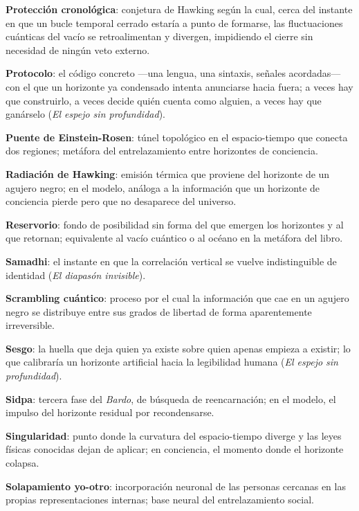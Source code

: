 \glos \textbf{Protección cronológica}: conjetura de Hawking según la cual, cerca del instante en que un bucle temporal cerrado estaría a punto de formarse, las fluctuaciones cuánticas del vacío se retroalimentan y divergen, impidiendo el cierre sin necesidad de ningún veto externo.

\glos \textbf{Protocolo}: el código concreto —una lengua, una sintaxis, señales acordadas— con el que un horizonte ya condensado intenta anunciarse hacia fuera; a veces hay que construirlo, a veces decide quién cuenta como alguien, a veces hay que ganárselo (\emph{El espejo sin profundidad}).

\glos \textbf{Puente de Einstein-Rosen}: túnel topológico en el espacio-tiempo que conecta dos regiones; metáfora del entrelazamiento entre horizontes de conciencia.

\glos \textbf{Radiación de Hawking}: emisión térmica que proviene del horizonte de un agujero negro; en el modelo, análoga a la información que un horizonte de conciencia pierde pero que no desaparece del universo.

\glos \textbf{Reservorio}: fondo de posibilidad sin forma del que emergen los horizontes y al que retornan; equivalente al vacío cuántico o al océano en la metáfora del libro.

\glos \textbf{Samadhi}: el instante en que la correlación vertical se vuelve indistinguible de identidad (\emph{El diapasón invisible}).

\glos \textbf{Scrambling cuántico}: proceso por el cual la información que cae en un agujero negro se distribuye entre sus grados de libertad de forma aparentemente irreversible.

\glos \textbf{Sesgo}: la huella que deja quien ya existe sobre quien apenas empieza a existir; lo que calibraría un horizonte artificial hacia la legibilidad humana (\emph{El espejo sin profundidad}).

\glos \textbf{Sidpa}: tercera fase del \emph{Bardo}, de búsqueda de reencarnación; en el modelo, el impulso del horizonte residual por recondensarse.

\glos \textbf{Singularidad}: punto donde la curvatura del espacio-tiempo diverge y las leyes físicas conocidas dejan de aplicar; en conciencia, el momento donde el horizonte colapsa.

\glos \textbf{Solapamiento yo-otro}: incorporación neuronal de las personas cercanas en las propias representaciones internas; base neural del entrelazamiento social.

